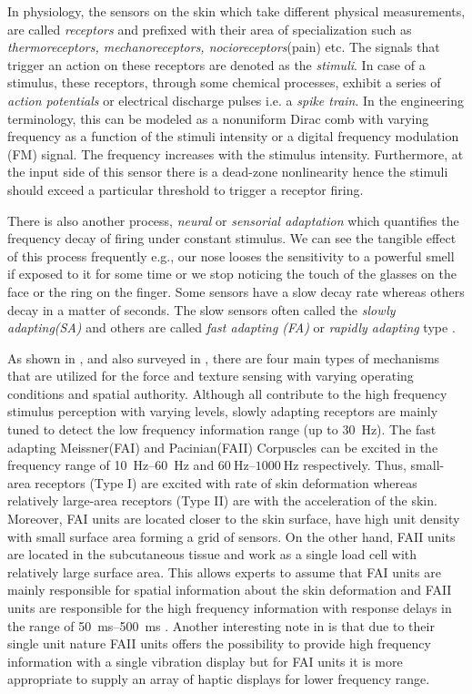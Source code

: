 In physiology, the sensors on the skin which take different physical measurements, are called \emph{receptors} and prefixed with their 
area of specialization such as \emph{thermoreceptors, mechanoreceptors, nocioreceptors}(pain) etc. The signals that trigger an action on 
these receptors are denoted as the \emph{stimuli}. In case of a stimulus, these receptors, through some chemical processes, exhibit a 
series of \emph{action potentials} or electrical discharge pulses i.e. a \emph{spike train}. In the engineering terminology, this can be 
modeled as a nonuniform Dirac comb with varying frequency as a function of the stimuli intensity or a digital frequency modulation (FM) 
signal. The frequency increases with the stimulus intensity. Furthermore, at the input side of this sensor there is a dead-zone 
nonlinearity hence the stimuli should exceed a particular threshold to trigger a receptor firing.

There is also another process, \emph{neural} or \emph{sensorial adaptation} which quantifies the frequency decay of firing under constant 
stimulus. We can see the tangible effect of this process frequently e.g., our nose looses the sensitivity to a powerful smell if exposed 
to it for some time or we stop noticing the touch of the glasses on the face or the ring on the finger. Some sensors have a slow decay 
rate whereas others decay in a matter of seconds. The slow sensors often called the \emph{slowly adapting(SA)} and others are called \emph
{fast adapting (FA)} or \emph{rapidly adapting} type \cite{burdea}.


As shown in , and also surveyed in \cite{kontarinis}, there are four main types of mechanisms that are utilized for the 
force and texture sensing with varying operating conditions and spatial authority. Although all contribute to the high frequency stimulus 
perception with varying levels, slowly adapting receptors are mainly tuned to detect the low frequency information range (up to \SI{30}{
\hertz}). The fast adapting Meissner(FAI) and Pacinian(FAII) Corpuscles can be excited in the frequency range of \SIrange{10}{60}{\hertz} 
and $\SIrange{60}{1000}{\hertz}$ respectively. Thus, small-area receptors (Type I) are excited with rate of skin deformation whereas 
relatively large-area receptors (Type II) are with the acceleration of the skin. Moreover, FAI units are located closer to the skin 
surface, have high unit density with small surface area forming a grid of sensors. On the other hand, FAII units are located in the 
subcutaneous tissue and work as a single load cell with relatively large surface area. This allows experts to assume that FAI units are 
mainly responsible for spatial information about the skin deformation and FAII units are responsible for the high frequency information 
with response delays in the range of \SIrange{50}{500}{\milli\second} \cite{idareview}. Another interesting note in \cite{kontarinis} is 
that due to their single unit nature FAII units offers the possibility to provide high frequency information with a single vibration 
display but for FAI units it is more appropriate to supply an array of haptic displays for lower frequency range.  


